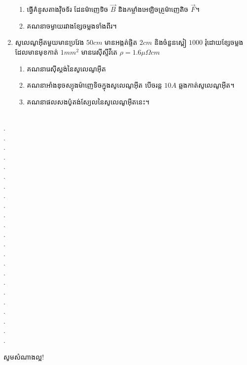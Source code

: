 \documentclass{officialexam}
\begin{document}
\begin{enumerate}[I]
	\begin{enumerate}[k]
		\item ធ្វើគំនូសតាងវុិចទ័រ ដែនម៉ាញេទិច $\vec{B}$ និងកម្លាំងអេឡិចត្រូម៉ាញេតិច $\vec{F}$។
		\item គណនាចម្ងាយរវាងខ្សែចម្លងទាំងពីរ។
	\end{enumerate}
	\item សូលេណូអុីតមួយមានប្រវែង $50cm$ មានអង្កត់ផ្ចិត $2cm$ និងចំនួនស្ពៀ $1000$ រុំដោយខ្សែចម្លងដែលមានមុខកាត់ $1mm^2$ មានរេសុីស្ទីវីតេ $\rho=1.6\mu\Omega cm$
	\begin{enumerate}[k]
		\item គណនារេសុីស្តង់នៃសូលេណូអុីត
		\item គណនាអាំងឌុចស្យុងម៉ាញេទិចក្នុងសូលេណូអុីត បើចរន្ត $10A$ ឆ្លងកាត់សូលេណូអុីត។
		\item គណនាផលសងប៉ូតង់ស្យែលនៃសូលេណូអុីតនេះ។
	\end{enumerate}
\end{enumerate}
\\
{\color{white}.}\dotfill\\
{\color{white}.}\dotfill\\
{\color{white}.}\dotfill
\\
{\color{white}.}\dotfill\\
{\color{white}.}\dotfill\\
{\color{white}.}\dotfill
\\
{\color{white}.}\dotfill\\
{\color{white}.}\dotfill\\
{\color{white}.}\dotfill
\\
{\color{white}.}\dotfill\\
{\color{white}.}\dotfill\\
{\color{white}.}\dotfill
\\
{\color{white}.}\dotfill\\
{\color{white}.}\dotfill\\
{\color{white}.}\dotfill
\\
{\color{white}.}\dotfill\\
{\color{white}.}\dotfill\\
{\color{white}.}\dotfill
\\
{\color{white}.}\dotfill\\
{\color{white}.}\dotfill\\
{\color{white}.}\dotfill
\\
{\color{white}.}\dotfill\\
{\color{white}.}\dotfill\\
\begin{center}
	\sffamily\color{blue}
	សូមសំណាងល្អ!
\end{center}\newpage
\end{document}
